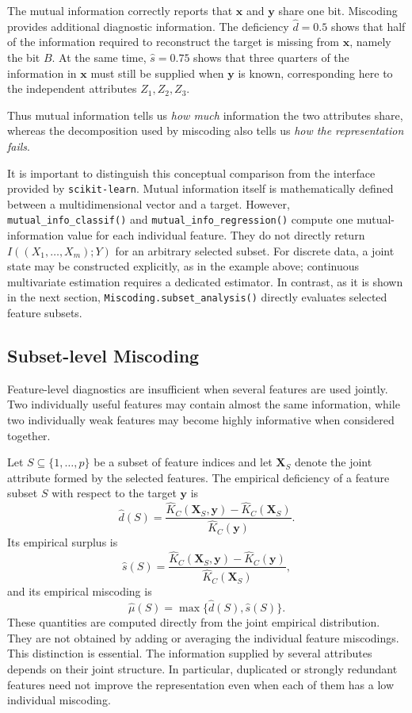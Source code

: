 \begin{example}
The mutual information correctly reports that $\mathbf{x}$ and $\mathbf{y}$ share one bit. Miscoding provides additional diagnostic information. The deficiency $\hat d=0.5$ shows that half of the information required to reconstruct the target is missing from $\mathbf{x}$, namely the bit $B$. At the same time, $\hat s=0.75$ shows that three quarters of the information in $\mathbf{x}$ must still be supplied when $\mathbf{y}$ is known, corresponding here to the independent attributes $Z_1,Z_2,Z_3$.

Thus mutual information tells us \emph{how much} information the two attributes share, whereas the decomposition used by miscoding also tells us \emph{how the representation fails}.
\end{example}

It is important to distinguish this conceptual comparison from the interface provided by \texttt{scikit-learn}. Mutual information itself is mathematically defined between a multidimensional vector and a target. However, \texttt{mutual\_info\_classif()} and \texttt{mutual\_info\_regression()} compute one mutual-information value for each individual feature. They do not directly return $I((X_1,\ldots,X_m);Y)$ for an arbitrary selected subset. For discrete data, a joint state may be constructed explicitly, as in the example above; continuous multivariate estimation requires a dedicated estimator. In contrast, as it is shown in the next section, \texttt{Miscoding.subset\_analysis()} directly evaluates selected feature subsets.

\subsection*{Subset-level Miscoding}

Feature-level diagnostics are insufficient when several features are used
jointly. Two individually useful features may contain almost the same
information, while two individually weak features may become highly
informative when considered together.

Let $S\subseteq\{1,\ldots,p\}$ be a subset of feature indices and let $\mathbf{X}_S$ denote the joint attribute formed by the selected features. The empirical deficiency of a feature subset $S$ with respect to the target
$\mathbf{y}$ is
\[
\hat d(S) = \frac{\hat K_C(\mathbf{X}_S,\mathbf{y}) - \hat K_C(\mathbf{X}_S)}{\hat K_C(\mathbf{y})}.
\]
Its empirical surplus is
\[
\hat s(S) = \frac{\hat K_C(\mathbf{X}_S,\mathbf{y}) - \hat K_C(\mathbf{y})}{\hat K_C(\mathbf{X}_S)},
\]
and its empirical miscoding is
\[
\hat\mu(S) = \max\{\hat d(S),\hat s(S)\}.
\]
These quantities are computed directly from the joint empirical distribution. They are not obtained by adding or averaging the individual feature miscodings. This distinction is essential. The information supplied by several attributes depends on their joint structure. In particular, duplicated or strongly redundant features need not improve the representation even when each of them has a low individual miscoding.


